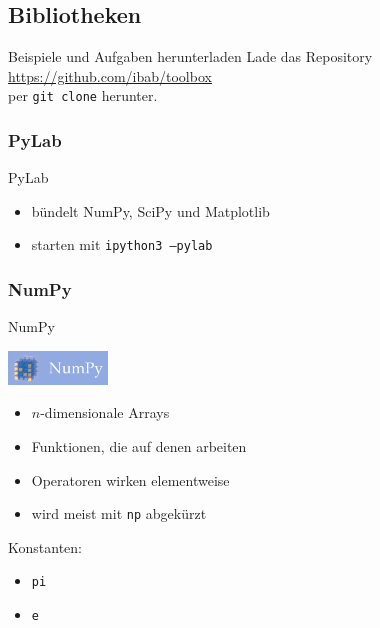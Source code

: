 
\subsection{Bibliotheken}

\begin{frame}{Beispiele und Aufgaben herunterladen}
  Lade das Repository \\
  \url{https://github.com/ibab/toolbox} \\
  per \texttt{git clone} herunter.
\end{frame}

\subsubsection{PyLab}
\begin{frame}{PyLab}
  \begin{itemize}
    \item bündelt NumPy, SciPy und Matplotlib
    \item starten mit \texttt{ipython3 --pylab}
  \end{itemize}
\end{frame}

\subsubsection{NumPy}
\begin{frame}{NumPy}
  \begin{center}
    \includegraphics[width=100px]{../Notes/img/numpy.png}
  \end{center}
  \begin{itemize}
    \item $n$-dimensionale Arrays
    \item Funktionen, die auf denen arbeiten
    \item Operatoren wirken elementweise
    \item wird meist mit \texttt{np} abgekürzt
  \end{itemize}

  Konstanten:
  \begin{itemize}
    \item \texttt{pi}
    \item \texttt{e}
  \end{itemize}
\end{frame}

